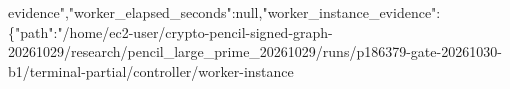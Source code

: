 \documentclass[10pt]{article}
\begin{document}
\allowbreak{}e\allowbreak{}v\allowbreak{}i\allowbreak{}d\allowbreak{}e\allowbreak{}n\allowbreak{}c\allowbreak{}e\allowbreak{}"\allowbreak{},\allowbreak{}"\allowbreak{}w\allowbreak{}o\allowbreak{}r\allowbreak{}k\allowbreak{}e\allowbreak{}r\allowbreak{}\_\allowbreak{}e\allowbreak{}l\allowbreak{}a\allowbreak{}p\allowbreak{}s\allowbreak{}e\allowbreak{}d\allowbreak{}\_\allowbreak{}s\allowbreak{}e\allowbreak{}c\allowbreak{}o\allowbreak{}n\allowbreak{}d\allowbreak{}s\allowbreak{}"\allowbreak{}:\allowbreak{}n\allowbreak{}u\allowbreak{}l\allowbreak{}l\allowbreak{},\allowbreak{}"\allowbreak{}w\allowbreak{}o\allowbreak{}r\allowbreak{}k\allowbreak{}e\allowbreak{}r\allowbreak{}\_\allowbreak{}i\allowbreak{}n\allowbreak{}s\allowbreak{}t\allowbreak{}a\allowbreak{}n\allowbreak{}c\allowbreak{}e\allowbreak{}\_\allowbreak{}e\allowbreak{}v\allowbreak{}i\allowbreak{}d\allowbreak{}e\allowbreak{}n\allowbreak{}c\allowbreak{}e\allowbreak{}"\allowbreak{}:\allowbreak{}\{\allowbreak{}"\allowbreak{}p\allowbreak{}a\allowbreak{}t\allowbreak{}h\allowbreak{}"\allowbreak{}:\allowbreak{}"\allowbreak{}/\allowbreak{}h\allowbreak{}o\allowbreak{}m\allowbreak{}e\allowbreak{}/\allowbreak{}e\allowbreak{}c\allowbreak{}2\allowbreak{}-\allowbreak{}u\allowbreak{}s\allowbreak{}e\allowbreak{}r\allowbreak{}/\allowbreak{}c\allowbreak{}r\allowbreak{}y\allowbreak{}p\allowbreak{}t\allowbreak{}o\allowbreak{}-\allowbreak{}p\allowbreak{}e\allowbreak{}n\allowbreak{}c\allowbreak{}i\allowbreak{}l\allowbreak{}-\allowbreak{}s\allowbreak{}i\allowbreak{}g\allowbreak{}n\allowbreak{}e\allowbreak{}d\allowbreak{}-\allowbreak{}g\allowbreak{}r\allowbreak{}a\allowbreak{}p\allowbreak{}h\allowbreak{}-\allowbreak{}2\allowbreak{}0\allowbreak{}2\allowbreak{}6\allowbreak{}1\allowbreak{}0\allowbreak{}2\allowbreak{}9\allowbreak{}/\allowbreak{}r\allowbreak{}e\allowbreak{}s\allowbreak{}e\allowbreak{}a\allowbreak{}r\allowbreak{}c\allowbreak{}h\allowbreak{}/\allowbreak{}p\allowbreak{}e\allowbreak{}n\allowbreak{}c\allowbreak{}i\allowbreak{}l\allowbreak{}\_\allowbreak{}l\allowbreak{}a\allowbreak{}r\allowbreak{}g\allowbreak{}e\allowbreak{}\_\allowbreak{}p\allowbreak{}r\allowbreak{}i\allowbreak{}m\allowbreak{}e\allowbreak{}\_\allowbreak{}2\allowbreak{}0\allowbreak{}2\allowbreak{}6\allowbreak{}1\allowbreak{}0\allowbreak{}2\allowbreak{}9\allowbreak{}/\allowbreak{}r\allowbreak{}u\allowbreak{}n\allowbreak{}s\allowbreak{}/\allowbreak{}p\allowbreak{}1\allowbreak{}8\allowbreak{}6\allowbreak{}3\allowbreak{}7\allowbreak{}9\allowbreak{}-\allowbreak{}g\allowbreak{}a\allowbreak{}t\allowbreak{}e\allowbreak{}-\allowbreak{}2\allowbreak{}0\allowbreak{}2\allowbreak{}6\allowbreak{}1\allowbreak{}0\allowbreak{}3\allowbreak{}0\allowbreak{}-\allowbreak{}b\allowbreak{}1\allowbreak{}/\allowbreak{}t\allowbreak{}e\allowbreak{}r\allowbreak{}m\allowbreak{}i\allowbreak{}n\allowbreak{}a\allowbreak{}l\allowbreak{}-\allowbreak{}p\allowbreak{}a\allowbreak{}r\allowbreak{}t\allowbreak{}i\allowbreak{}a\allowbreak{}l\allowbreak{}/\allowbreak{}c\allowbreak{}o\allowbreak{}n\allowbreak{}t\allowbreak{}r\allowbreak{}o\allowbreak{}l\allowbreak{}l\allowbreak{}e\allowbreak{}r\allowbreak{}/\allowbreak{}w\allowbreak{}o\allowbreak{}r\allowbreak{}k\allowbreak{}e\allowbreak{}r\allowbreak{}-\allowbreak{}i\allowbreak{}n\allowbreak{}s\allowbreak{}t\allowbreak{}a\allowbreak{}n\allowbreak{}c\allowbreak{}e\allowbrea
\end{document}
